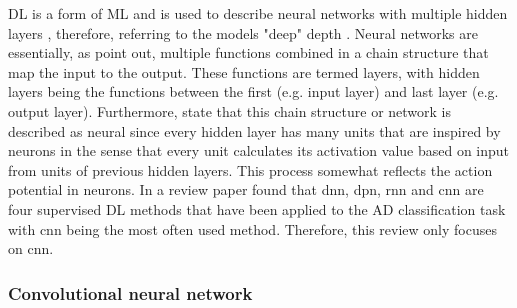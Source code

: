 


\gls{DL} is a form of \gls{ML} \autocite{deeplearningav} and is used to describe neural networks with multiple hidden layers \autocite{introtostat}, therefore, referring to the models "deep" depth \autocite{deeplearningav}. Neural networks are essentially, as \textcite{deeplearningav} point out, multiple functions combined in a chain structure that map the input to the output. These functions are termed layers, with hidden layers being the functions between the first (e.g. input layer) and last layer (e.g. output layer). Furthermore, \textcite{deeplearningav} state that this chain structure or network is described as neural since every hidden layer has many units that are inspired by neurons in the sense that every unit calculates its activation value based on input from units of previous hidden layers. This process somewhat reflects the action potential in neurons. 
In a review paper \textcite{ebrahimighahnaviehDeepLearningDetect2020} found that \gls{dnn}, \gls{dpn}, \gls{rnn} and \gls{cnn} are four supervised \gls{DL} methods that have been applied to the \gls{AD} classification task with \gls{cnn} being the most often used method. Therefore, this review only focuses on \gls{cnn}. 






















\subsubsection{Convolutional neural network}

